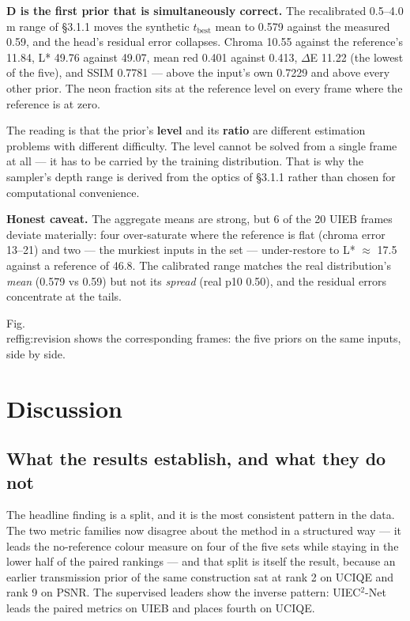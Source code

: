 \documentclass[journal]{IEEEtran}
\begin{document}
\textbf{D is the first prior that is simultaneously correct.} The recalibrated 0.5--4.0 m range of \S{}3.1.1 moves the synthetic $t_{\mathrm{best}}$ mean to 0.579 against the measured 0.59, and the head's residual error collapses. Chroma 10.55 against the reference's 11.84, L* 49.76 against 49.07, mean red 0.401 against 0.413, $\Delta$E 11.22 (the lowest of the five), and SSIM 0.7781 --- above the input's own 0.7229 and above every other prior. The neon fraction sits at the reference level on every frame where the reference is at zero.

The reading is that the prior's \textbf{level} and its \textbf{ratio} are different estimation problems with different difficulty. The level cannot be solved from a single frame at all --- it has to be carried by the training distribution. That is why the sampler's depth range is derived from the optics of \S{}3.1.1 rather than chosen for computational convenience.

\textbf{Honest caveat.} The aggregate means are strong, but 6 of the 20 UIEB frames deviate materially: four over-saturate where the reference is flat (chroma error 13--21) and two --- the murkiest inputs in the set --- under-restore to L* $\approx$ 17.5 against a reference of 46.8. The calibrated range matches the real distribution's \emph{mean} (0.579 vs 0.59) but not its \emph{spread} (real p10 0.50), and the residual errors concentrate at the tails.

Fig.~\\ref{fig:revision} shows the corresponding frames: the five priors on the same inputs, side by side.


\section{Discussion}
\subsection{What the results establish, and what they do not}
The headline finding is a split, and it is the most consistent pattern in the data. The two metric families now disagree about the method in a structured way --- it leads the no-reference colour measure on four of the five sets while staying in the lower half of the paired rankings --- and that split is itself the result, because an earlier transmission prior of the same construction sat at rank 2 on UCIQE and rank 9 on PSNR. The supervised leaders show the inverse pattern: UIEC$^{2}$-Net leads the paired metrics on UIEB and places fourth on UCIQE.
\end{document}
